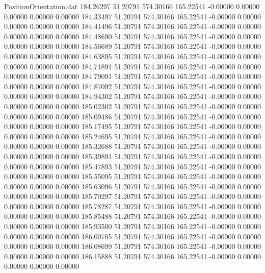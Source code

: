 \begin{filecontents}{PositionOrientation.dat}
 184.26297   51.20791  574.30166   165.22541   -0.00000    0.00000    0.00000    0.00000    0.00000
 184.33497   51.20791  574.30166   165.22541   -0.00000    0.00000    0.00000    0.00000    0.00000
 184.41496   51.20791  574.30166   165.22541   -0.00000    0.00000    0.00000    0.00000    0.00000
 184.48690   51.20791  574.30166   165.22541   -0.00000    0.00000    0.00000    0.00000    0.00000
 184.56689   51.20791  574.30166   165.22541   -0.00000    0.00000    0.00000    0.00000    0.00000
 184.63895   51.20791  574.30166   165.22541   -0.00000    0.00000    0.00000    0.00000    0.00000
 184.71891   51.20791  574.30166   165.22541   -0.00000    0.00000    0.00000    0.00000    0.00000
 184.79091   51.20791  574.30166   165.22541   -0.00000    0.00000    0.00000    0.00000    0.00000
 184.87092   51.20791  574.30166   165.22541   -0.00000    0.00000    0.00000    0.00000    0.00000
 184.94302   51.20791  574.30166   165.22541   -0.00000    0.00000    0.00000    0.00000    0.00000
 185.02302   51.20791  574.30166   165.22541   -0.00000    0.00000    0.00000    0.00000    0.00000
 185.09486   51.20791  574.30166   165.22541   -0.00000    0.00000    0.00000    0.00000    0.00000
 185.17495   51.20791  574.30166   165.22541   -0.00000    0.00000    0.00000    0.00000    0.00000
 185.24695   51.20791  574.30166   165.22541   -0.00000    0.00000    0.00000    0.00000    0.00000
 185.32688   51.20791  574.30166   165.22541   -0.00000    0.00000    0.00000    0.00000    0.00000
 185.39891   51.20791  574.30166   165.22541   -0.00000    0.00000    0.00000    0.00000    0.00000
 185.47893   51.20791  574.30166   165.22541   -0.00000    0.00000    0.00000    0.00000    0.00000
 185.55095   51.20791  574.30166   165.22541   -0.00000    0.00000    0.00000    0.00000    0.00000
 185.63096   51.20791  574.30166   165.22541   -0.00000    0.00000    0.00000    0.00000    0.00000
 185.70297   51.20791  574.30166   165.22541   -0.00000    0.00000    0.00000    0.00000    0.00000
 185.78287   51.20791  574.30166   165.22541   -0.00000    0.00000    0.00000    0.00000    0.00000
 185.85488   51.20791  574.30166   165.22541   -0.00000    0.00000    0.00000    0.00000    0.00000
 185.93500   51.20791  574.30166   165.22541   -0.00000    0.00000    0.00000    0.00000    0.00000
 186.00705   51.20791  574.30166   165.22541   -0.00000    0.00000    0.00000    0.00000    0.00000
 186.08699   51.20791  574.30166   165.22541   -0.00000    0.00000    0.00000    0.00000    0.00000
 186.15888   51.20791  574.30166   165.22541   -0.00000    0.00000    0.00000    0.00000    0.00000

\end{filecontents}
